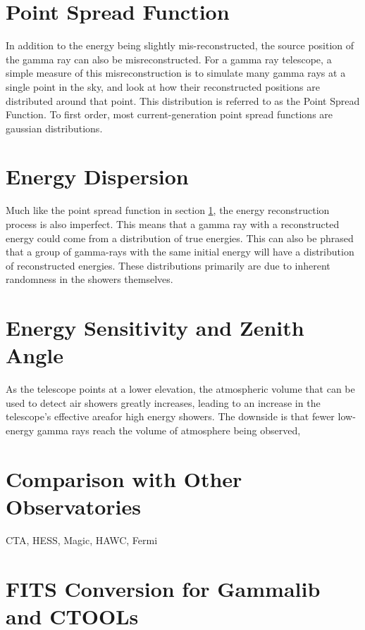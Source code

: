 \section{Point Spread Function}\label{sec:psf}
In addition to the energy being slightly mis-reconstructed, the source position of the gamma ray can also be misreconstructed.
For a gamma ray telescope, a simple measure of this misreconstruction is to simulate many gamma rays at a single point in the sky, and look at how their reconstructed positions are distributed around that point.
This distribution is referred to as the Point Spread Function.
To first order, most current-generation point spread functions are gaussian distributions.


\section{Energy Dispersion}
Much like the point spread function in section \ref{sec:psf}, the energy reconstruction process is also imperfect.
This means that a gamma ray with a reconstructed energy could come from a distribution of true energies.
This can also be phrased that a group of gamma-rays with the same initial energy will have a distribution of reconstructed energies.
These distributions primarily are due to inherent randomness in the showers themselves.


\section{Energy Sensitivity and Zenith Angle}

As the telescope points at a lower elevation, the atmospheric volume that can be used to detect air showers greatly increases, leading to an increase in the telescope's effective areafor high energy showers.
The downside is that fewer low-energy gamma rays reach the volume of atmosphere being observed, 


\section{Comparison with Other Observatories}


CTA, HESS, Magic, HAWC, Fermi

\section{FITS Conversion for Gammalib and CTOOLs}

